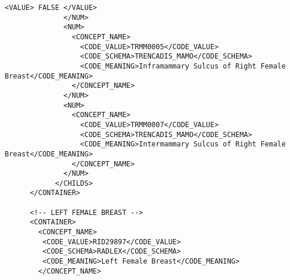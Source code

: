 \begin{lstlisting}[label=dicom-report,caption=Informe estructurado de una exploración de mama]
                <VALUE> FALSE </VALUE>
              </NUM>
              <NUM>
                <CONCEPT_NAME>
                  <CODE_VALUE>TRMM0005</CODE_VALUE>
                  <CODE_SCHEMA>TRENCADIS_MAMO</CODE_SCHEMA>
                  <CODE_MEANING>Inframammary Sulcus of Right Female Breast</CODE_MEANING>
                </CONCEPT_NAME>
              </NUM>
              <NUM>
                <CONCEPT_NAME>
                  <CODE_VALUE>TRMM0007</CODE_VALUE>
                  <CODE_SCHEMA>TRENCADIS_MAMO</CODE_SCHEMA>
                  <CODE_MEANING>Intermammary Sulcus of Right Female Breast</CODE_MEANING>
                </CONCEPT_NAME>
              </NUM>
            </CHILDS>
      </CONTAINER>

      <!-- LEFT FEMALE BREAST -->
      <CONTAINER>
        <CONCEPT_NAME>
         <CODE_VALUE>RID29897</CODE_VALUE>
         <CODE_SCHEMA>RADLEX</CODE_SCHEMA>
         <CODE_MEANING>Left Female Breast</CODE_MEANING>
        </CONCEPT_NAME>


\end{lstlisting}
